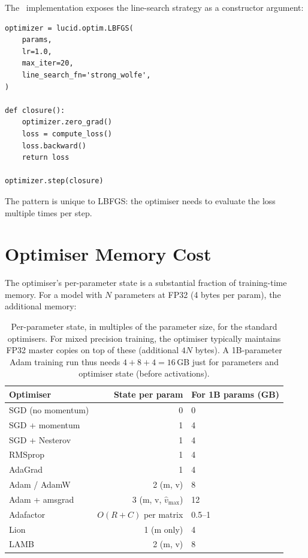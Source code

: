 The \Lucid\ implementation exposes the line-search strategy as a
constructor argument:

\begin{lstlisting}[style=lucid,language=LucidPython]
optimizer = lucid.optim.LBFGS(
    params,
    lr=1.0,
    max_iter=20,
    line_search_fn='strong_wolfe',
)

def closure():
    optimizer.zero_grad()
    loss = compute_loss()
    loss.backward()
    return loss

optimizer.step(closure)
\end{lstlisting}

The  pattern is unique to LBFGS: the optimiser
needs to evaluate the loss multiple times per step.

\section{Optimiser Memory Cost}
\label{sec:optimizers:memory_cost}

The optimiser's per-parameter state is a substantial fraction
of training-time memory. For a model with $N$ parameters at
FP32 (4 bytes per param), the additional memory:

\begin{table}[t]
\centering
\small
\begin{tabular}{lrl}
\toprule
Optimiser & State per param & For 1B params (GB) \\
\midrule
SGD (no momentum)          & 0     & 0  \\
SGD + momentum             & 1     & 4  \\
SGD + Nesterov             & 1     & 4  \\
RMSprop                    & 1     & 4  \\
AdaGrad                    & 1     & 4  \\
Adam / AdamW               & 2 (m, v) & 8  \\
Adam + amsgrad             & 3 (m, v, $\hat v_{\max}$) & 12 \\
Adafactor                  & $O(R + C)$ per matrix & 0.5--1 \\
Lion                       & 1 (m only) & 4 \\
LAMB                       & 2 (m, v) & 8 \\
\bottomrule
\end{tabular}
\caption[Optimiser memory cost.]{Per-parameter state, in
multiples of the parameter size, for the standard optimisers.
For mixed precision training, the optimiser typically maintains
FP32 master copies on top of these (additional $4 N$ bytes).
A 1B-parameter Adam training run thus needs
$4 + 8 + 4 = 16$\,GB just for parameters and optimiser state
(before activations).}
\label{tab:optimizers:memory_cost}
\end{table}

